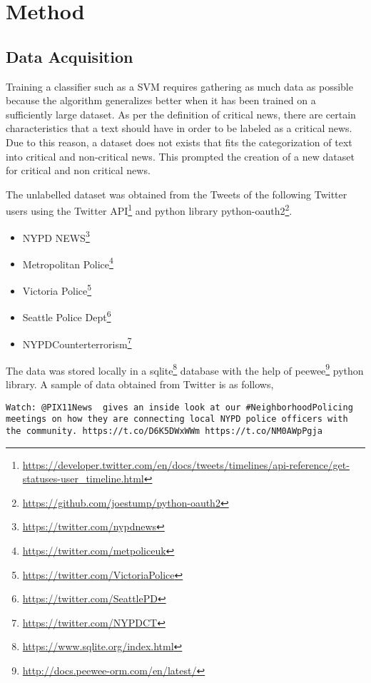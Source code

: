 \chapter{Method} \label{method}

\section{Data Acquisition}
Training a classifier such as a SVM requires gathering as much data as possible because the algorithm generalizes better when it has been trained on a sufficiently large dataset. As per the definition of critical news, there are certain characteristics that a text should have in order to be labeled as a critical news. Due to this reason, a dataset does not exists that fits the categorization of text into critical and non-critical news. This prompted the creation of a new dataset for critical and non critical news.\par
The unlabelled dataset was obtained from the Tweets of the following Twitter users using the Twitter API\footnote{\url{https://developer.twitter.com/en/docs/tweets/timelines/api-reference/get-statuses-user_timeline.html}} and python library python-oauth2\footnote{\url{https://github.com/joestump/python-oauth2}}.

\begin{itemize}
    \item NYPD NEWS\footnote{\url{https://twitter.com/nypdnews}}
    \item Metropolitan Police\footnote{\url{https://twitter.com/metpoliceuk}}
    \item  Victoria Police\footnote{\url{https://twitter.com/VictoriaPolice}}
    \item Seattle Police Dept\footnote{\url{https://twitter.com/SeattlePD}}
    \item NYPDCounterterrorism\footnote{\url{https://twitter.com/NYPDCT}}
\end{itemize}

The data was stored locally in a sqlite\footnote{\url{https://www.sqlite.org/index.html}} database with the help of peewee\footnote{\url{http://docs.peewee-orm.com/en/latest/}} python library. A sample of data obtained from Twitter is as follows,

\begin{verbatim}
Watch: @PIX11News  gives an inside look at our #NeighborhoodPolicing
meetings on how they are connecting local NYPD police officers with
the community. https://t.co/D6K5DWxWWm https://t.co/NM0AWpPgja
\end{verbatim}


